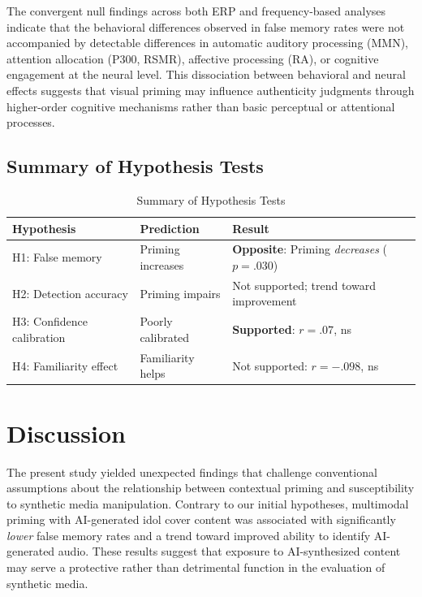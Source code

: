 \documentclass[12pt, a4paper]{article}
\begin{document}
The convergent null findings across both ERP and frequency-based analyses indicate that the behavioral differences observed in false memory rates were not accompanied by detectable differences in automatic auditory processing (MMN), attention allocation (P300, RSMR), affective processing (RA), or cognitive engagement at the neural level. This dissociation between behavioral and neural effects suggests that visual priming may influence authenticity judgments through higher-order cognitive mechanisms rather than basic perceptual or attentional processes.

\subsection{Summary of Hypothesis Tests}

\begin{table}[H]
\centering
\caption{Summary of Hypothesis Tests}
\begin{tabular}{lll}
\toprule
Hypothesis & Prediction & Result \\
\midrule
H1: False memory & Priming increases & \textbf{Opposite}: Priming \textit{decreases} ($p = .030$) \\
H2: Detection accuracy & Priming impairs & Not supported; trend toward improvement \\
H3: Confidence calibration & Poorly calibrated & \textbf{Supported}: $r = .07$, ns \\
H4: Familiarity effect & Familiarity helps & Not supported: $r = -.098$, ns \\
\bottomrule
\end{tabular}
\label{tab:hypotheses}
\end{table}


\section{Discussion}

The present study yielded unexpected findings that challenge conventional assumptions about the relationship between contextual priming and susceptibility to synthetic media manipulation. Contrary to our initial hypotheses, multimodal priming with AI-generated idol cover content was associated with significantly \textit{lower} false memory rates and a trend toward improved ability to identify AI-generated audio. These results suggest that exposure to AI-synthesized content may serve a protective rather than detrimental function in the evaluation of synthetic media.
\end{document}
